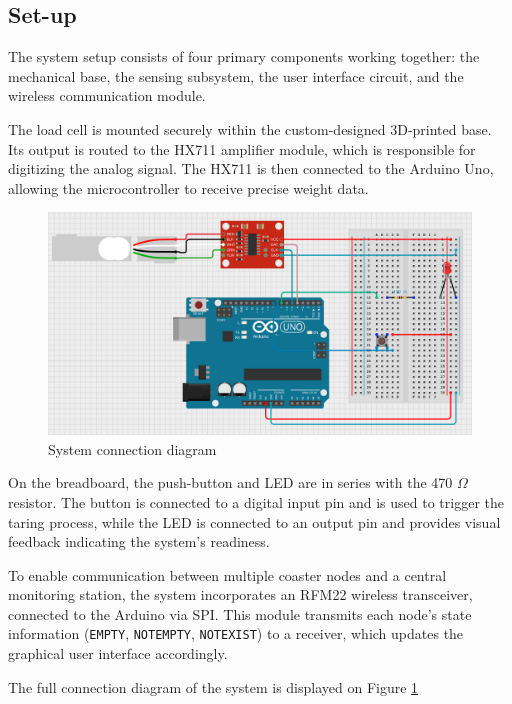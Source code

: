 \subsection{Set-up}
The system setup consists of four primary components working together: the mechanical base, the sensing subsystem, the user interface circuit, and the wireless communication module.

The load cell is mounted securely within the custom-designed 3D-printed base. Its output is routed to the HX711 amplifier module, which is responsible for digitizing the analog signal. The HX711 is then connected to the Arduino Uno, allowing the microcontroller to receive precise weight data.

\begin{figure}[H]
    \centering
    \includegraphics[width=\linewidth]{load cell images/circuit.png}
    \caption{System connection diagram}
    \label{fig:circuit}
\end{figure}

On the breadboard, the push-button and LED are in series with the 470 $\Omega$ resistor. The button is connected to a digital input pin and is used to trigger the taring process, while the LED is connected to an output pin and provides visual feedback indicating the system’s readiness.

To enable communication between multiple coaster nodes and a central monitoring station, the system incorporates an RFM22 wireless transceiver, connected to the Arduino via SPI. This module transmits each node’s state information (\texttt{EMPTY}, \texttt{NOTEMPTY}, \texttt{NOTEXIST}) to a receiver, which updates the graphical user interface accordingly.

The full connection diagram of the system is displayed on Figure \ref{fig:circuit}

